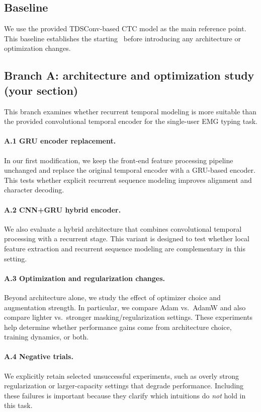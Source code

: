 \documentclass{article}
\newcommand{\cer}{\mathrm{CER}}
\begin{document}
\subsection{Baseline}
We use the provided TDSConv-based CTC model as the main reference point.
This baseline establishes the starting \cer\ before introducing any architecture or optimization changes.



\subsection{Branch A: architecture and optimization study (your section)}
\label{sec:branchA}
This branch examines whether recurrent temporal modeling is more suitable than the provided convolutional temporal encoder for the single-user EMG typing task.

\paragraph{A.1 GRU encoder replacement.}
In our first modification, we keep the front-end feature processing pipeline unchanged and replace the original temporal encoder with a GRU-based encoder.
This tests whether explicit recurrent sequence modeling improves alignment and character decoding.

\paragraph{A.2 CNN+GRU hybrid encoder.}
We also evaluate a hybrid architecture that combines convolutional temporal processing with a recurrent stage.
This variant is designed to test whether local feature extraction and recurrent sequence modeling are complementary in this setting.

\paragraph{A.3 Optimization and regularization changes.}
Beyond architecture alone, we study the effect of optimizer choice and augmentation strength.
In particular, we compare Adam vs.\ AdamW and also compare lighter vs.\ stronger masking/regularization settings.
These experiments help determine whether performance gains come from architecture choice, training dynamics, or both.

\paragraph{A.4 Negative trials.}
We explicitly retain selected unsuccessful experiments, such as overly strong regularization or larger-capacity settings that degrade performance.
Including these failures is important because they clarify which intuitions do \emph{not} hold in this task.
\end{document}
